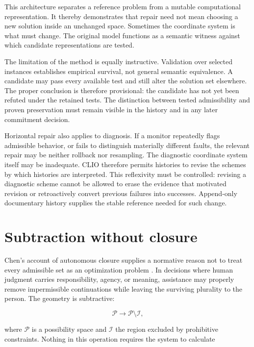 \documentclass[11pt]{article}
\begin{document}
This architecture separates a reference problem from a mutable computational representation. It thereby demonstrates that repair need not mean choosing a new solution inside an unchanged space. Sometimes the coordinate system is what must change. The original model functions as a semantic witness against which candidate representations are tested.

The limitation of the method is equally instructive. Validation over selected instances establishes empirical survival, not general semantic equivalence. A candidate may pass every available test and still alter the solution set elsewhere. The proper conclusion is therefore provisional: the candidate has not yet been refuted under the retained tests. The distinction between tested admissibility and proven preservation must remain visible in the history and in any later commitment decision.

Horizontal repair also applies to diagnosis. If a monitor repeatedly flags admissible behavior, or fails to distinguish materially different faults, the relevant repair may be neither rollback nor resampling. The diagnostic coordinate system itself may be inadequate. CLIO therefore permits histories to revise the schemes by which histories are interpreted. This reflexivity must be controlled: revising a diagnostic scheme cannot be allowed to erase the evidence that motivated revision or retroactively convert previous failures into successes. Append-only documentary history supplies the stable reference needed for such change.

\section{Subtraction without closure}

Chen's account of autonomous closure supplies a normative reason not to treat every admissible set as an optimization problem \cite{chen2026}. In decisions where human judgment carries responsibility, agency, or meaning, assistance may properly remove impermissible continuations while leaving the surviving plurality to the person. The geometry is subtractive:

\begin{equation}
\mathcal{P}
\longrightarrow
\mathcal{P}\setminus\mathcal{I},
\end{equation}

where $\mathcal{P}$ is a possibility space and $\mathcal{I}$ the region excluded by prohibitive constraints. Nothing in this operation requires the system to calculate
\end{document}

